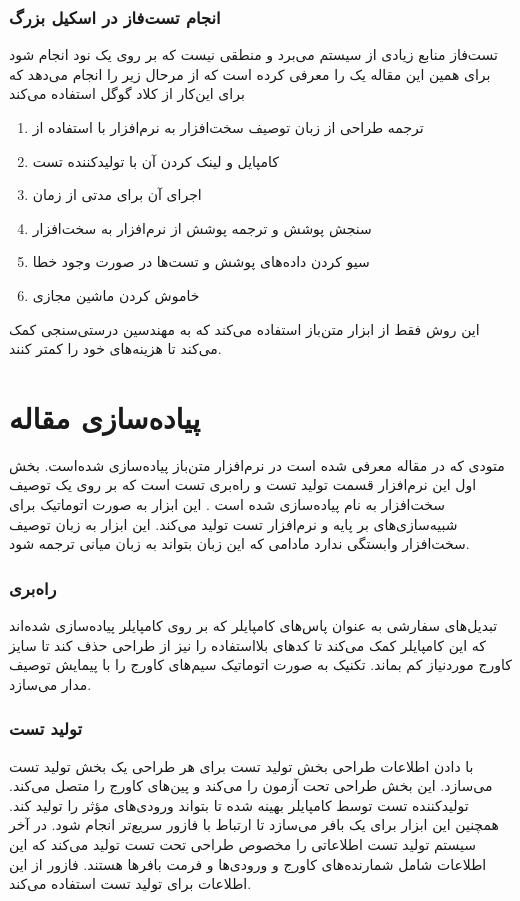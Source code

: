 \documentclass[conference]{IEEEtran}
\begin{document}
\subsubsection{انجام تست‌فاز در اسکیل بزرگ}
تست‌فاز منابع زیادی از سیستم می‌برد و منطقی نیست که بر روی یک نود انجام شود
برای همین این مقاله یک
را معرفی کرده است که از مرحال زیر را انجام می‌دهد که برای این‌کار از کلاد گوگل استفاده می‌کند
\begin{enumerate}
    \item ترجمه طراحی از زبان توصیف سخت‌افزار به نرم‌افزار با استفاده از
    \item کامپایل و لینک کردن آن با تولید‌کننده تست
    \item اجرای آن برای مدتی از زمان
    \item سنجش پوشش و ترجمه پوشش از نرم‌افزار به سخت‌افزار
    \item سیو کردن داده‌های پوشش و تست‌ها در صورت وجود خطا
    \item خاموش کردن ماشین مجازی
\end{enumerate}
این روش فقط از ابزار متن‌باز استفاده می‌کند که به مهندسین درستی‌سنجی کمک می‌کند
تا هزینه‌های خود را کمتر کنند.
\section{پیاده‌سازی مقاله
}
متودی‌ که در مقاله
\cite{rf}
معرفی شده است در نرم‌افزار متن‌باز
پیاده‌سازی شده‌است.
بخش اول این‌ نرم‌افزار قسمت تولید تست و راه‌بری تست است که بر روی یک توصیف سخت‌افزار
به نام
پیاده‌سازی شده است
\cite{firrtl}.
این ابزار به صورت اتوماتیک برای شبیه‌سازی‌های بر پایه
و نرم‌افزار تست تولید می‌کند.
این ابزار به زبان توصیف سخت‌افزار وابستگی ندارد مادامی که
این زبان بتواند به زبان میانی
ترجمه شود.
\subsubsection{راه‌بری}
تبدیل‌های سفارشی به عنوان پاس‌های کامپایلر که بر روی کامپایلر
پیاده‌سازی شده‌اند که این کامپایلر کمک می‌کند
تا کد‌های بلااستفاده را نیز از طراحی حذف کند تا سایز کاورج مورد‌نیاز
کم بماند.
تکنیک
به صورت اتوماتیک سیم‌های کاورج را با پیمایش توصیف مدار می‌سازد.
\subsubsection{تولید تست}
با دادن اطلاعات طراحی بخش تولید تست برای هر طراحی
یک بخش تولید تست می‌سازد.
این بخش طراحی تحت آزمون را
می‌کند و پین‌های کاورج را متصل می‌کند.
تولید‌کننده تست توسط کامپایلر
بهینه شده تا بتواند ورودی‌های مؤثر را تولید کند.
همچنین این ابزار برای
یک بافر می‌سازد تا ارتباط با فازور سریع‌تر انجام شود.
در آخر سیستم‌ تولید تست اطلاعاتی را مخصوص طراحی تحت تست تولید می‌کند
که این اطلاعات شامل شمارنده‌های کاورج و ورودی‌ها و فرمت بافر‌ها هستند.
فازور از این اطلاعات برای تولید تست استفاده می‌کند.
\end{document}

